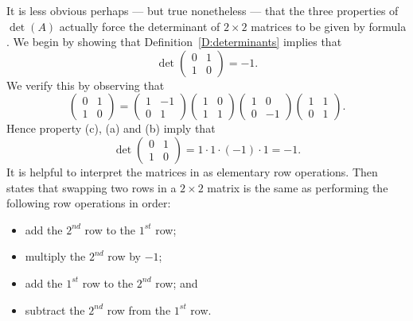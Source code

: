 \documentclass{ximera}
\begin{document}
It is less obvious perhaps --- but true nonetheless --- that the
three properties of $\det(A)$ actually force the determinant of
$2\times 2$ matrices to be given by formula
. We begin by showing that
Definition~\ref{D:determinants} implies that 
\begin{equation}  \label{e:detswap}
\det \left(\begin{array}{cc} 0 & 1\\1 & 0 \end{array}\right)=-1.
\end{equation}
We verify this by observing that 
\begin{equation} \label{e:swapdecomp}
\left(\begin{array}{cc} 0 & 1\\1 & 0 \end{array}\right) =
\left(\begin{array}{cr} 1 & -1\\0 & 1 \end{array}\right)
\left(\begin{array}{cc} 1 & 0\\1 & 1 \end{array}\right)
\left(\begin{array}{cr} 1 & 0\\0 & -1 \end{array}\right)
\left(\begin{array}{cc} 1 & 1\\0 & 1 \end{array}\right).
\end{equation}
Hence property (c), (a) and (b) imply that
\[
\det \left(\begin{array}{cc} 0 & 1\\1 & 0 \end{array}\right) =
1\cdot 1\cdot (-1) \cdot 1 = -1.
\]
It is helpful to interpret the matrices in  as
elementary row operations.  
Then  states that
swapping two rows in a $2\times 2$ matrix is the same as
performing the following row operations in order:
\begin{itemize}
\item        add the $2^{nd}$ row to the  $1^{st}$ row;
\item        multiply the $2^{nd}$ row by $-1$; 
\item        add the $1^{st}$ row to the $2^{nd}$ row; and  
\item        subtract the $2^{nd}$ row from the $1^{st}$ row.
\end{itemize}
 
\end{document}
